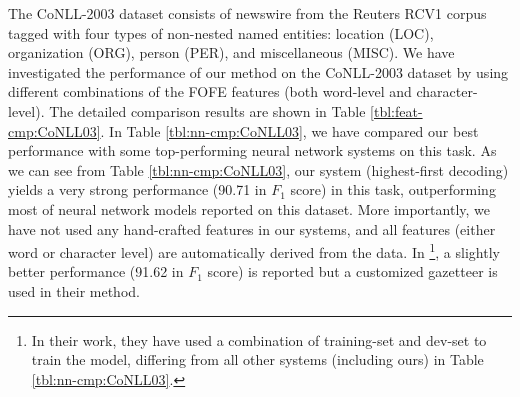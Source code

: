 \documentclass[11pt,a4paper]{article}
\newcommand{\cmark}{\ding{51}}
\newcommand{\xmark}{\ding{55}}
\begin{document}
The CoNLL-2003 dataset \cite{tjong2003introduction} consists of newswire from the Reuters RCV1 corpus tagged with four types of non-nested named entities: location (LOC), organization (ORG), person (PER), and miscellaneous (MISC).
We have investigated the performance of our method on the CoNLL-2003 dataset by using different combinations of the FOFE features (both word-level and character-level). The detailed comparison results are shown in Table \ref{tbl:feat-cmp:CoNLL03}.  In Table \ref{tbl:nn-cmp:CoNLL03}, we have compared our best performance with some top-performing neural network systems on this task. As we can see from Table \ref{tbl:nn-cmp:CoNLL03}, our system (highest-first decoding) yields a very strong performance (90.71 in $F_1$ score) in this task, outperforming most of neural network models reported on this dataset. More importantly, we have not used any hand-crafted features in our systems, and all features (either word or character level) are automatically derived from the data. 
In \cite{chiu2016named}\footnote{In their work, they have used a combination of training-set and dev-set to train the model, differing from all other systems (including ours) in Table \ref{tbl:nn-cmp:CoNLL03}.}, a slightly better performance (91.62 in $F_1$ score) is reported but a customized gazetteer is used in their method.


\end{document}
